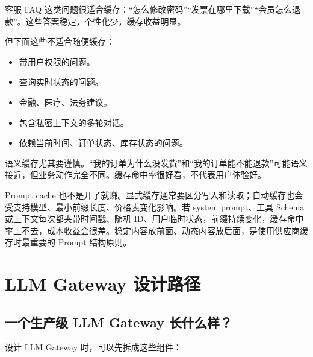 \documentclass[9pt,a4paper,twocolumn]{ctexart}
\begin{document}
客服 FAQ 这类问题很适合缓存：“怎么修改密码”“发票在哪里下载”“会员怎么退款”。这些答案稳定，个性化少，缓存收益明显。



但下面这些不适合随便缓存：


\begin{itemize}[itemsep=1pt, topsep=2pt]
  \item 带用户权限的问题。
  \item 查询实时状态的问题。
  \item 金融、医疗、法务建议。
  \item 包含私密上下文的多轮对话。
  \item 依赖当前时间、订单状态、库存状态的问题。
\end{itemize}


语义缓存尤其要谨慎。“我的订单为什么没发货”和“我的订单能不能退款”可能语义接近，但业务动作完全不同。缓存命中率很好看，不代表用户体验好。



Prompt cache 也不是开了就赚。显式缓存通常要区分写入和读取；自动缓存也会受支持模型、最小前缀长度、价格表变化影响。若 system prompt、工具 Schema 或上下文每次都夹带时间戳、随机 ID、用户临时状态，前缀持续变化，缓存命中率上不去，成本收益会很差。稳定内容放前面、动态内容放后面，是使用供应商缓存时最重要的 Prompt 结构原则。



\section*{LLM Gateway 设计路径}


\subsection*{一个生产级 LLM Gateway 长什么样？}


设计 LLM Gateway 时，可以先拆成这些组件：
\end{document}
